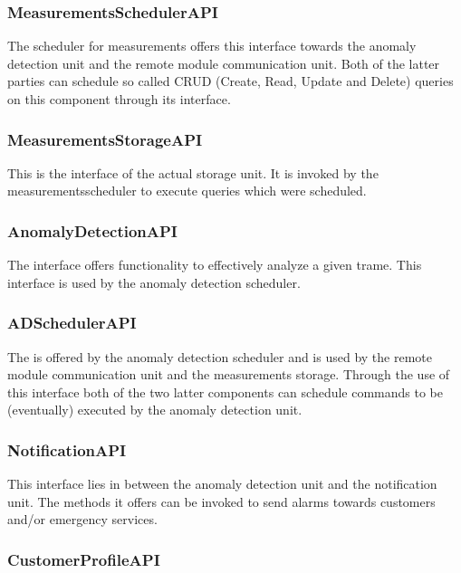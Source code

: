 \subsubsection{MeasurementsSchedulerAPI}

\npar The scheduler for measurements offers this interface towards the anomaly
detection unit and the remote module communication unit. Both of the latter
parties can schedule so called CRUD (Create, Read, Update and Delete) queries on
this component through its interface.

\subsubsection{MeasurementsStorageAPI}

\npar This is the interface of the actual storage unit. It is invoked by the
measurementsscheduler to execute queries which were scheduled.  

\subsubsection{AnomalyDetectionAPI}

\npar The  interface offers functionality to
effectively analyze a given trame. This interface is used by the anomaly
detection scheduler.

\subsubsection{ADSchedulerAPI}

\npar The  is offered by the anomaly detection
scheduler and is used by the remote module communication unit and the
measurements storage. Through the use of this interface both of the two latter
components can schedule commands to be (eventually) executed by the anomaly
detection unit.

\subsubsection{NotificationAPI}

\npar This interface lies in between the anomaly detection unit and the
notification unit. The methods it offers can be invoked to send alarms towards
customers and/or emergency services.

\subsubsection{CustomerProfileAPI}

